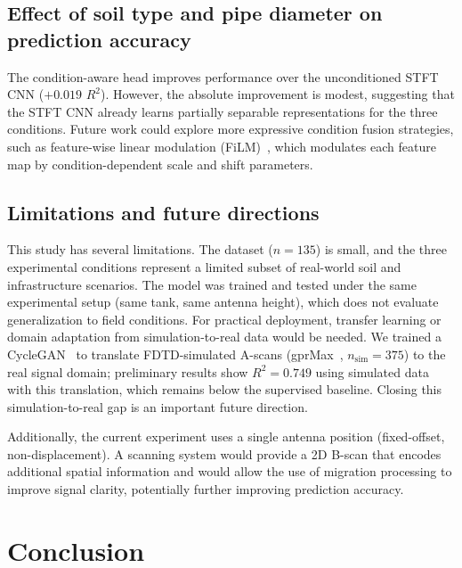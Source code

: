 \documentclass[review]{elsarticle}
\begin{document}
\subsection{Effect of soil type and pipe diameter on prediction accuracy}

The condition-aware head improves performance over the unconditioned STFT CNN ($+0.019$ $R^2$). However, the absolute improvement is modest, suggesting that the STFT CNN already learns partially separable representations for the three conditions. Future work could explore more expressive condition fusion strategies, such as feature-wise linear modulation (FiLM)~\cite{Perez2018}, which modulates each feature map by condition-dependent scale and shift parameters.

\subsection{Limitations and future directions}

This study has several limitations. The dataset ($n = 135$) is small, and the three experimental conditions represent a limited subset of real-world soil and infrastructure scenarios. The model was trained and tested under the same experimental setup (same tank, same antenna height), which does not evaluate generalization to field conditions. For practical deployment, transfer learning or domain adaptation from simulation-to-real data would be needed. We trained a CycleGAN~\cite{Zhu2017} to translate FDTD-simulated A-scans (gprMax~\cite{Warren2016}, $n_{\text{sim}} = 375$) to the real signal domain; preliminary results show $R^2 = 0.749$ using simulated data with this translation, which remains below the supervised baseline. Closing this simulation-to-real gap is an important future direction.

Additionally, the current experiment uses a single antenna position (fixed-offset, non-displacement). A scanning system would provide a 2D B-scan that encodes additional spatial information and would allow the use of migration processing to improve signal clarity, potentially further improving prediction accuracy.


\section{Conclusion}
\label{sec:conclusion}
\end{document}
